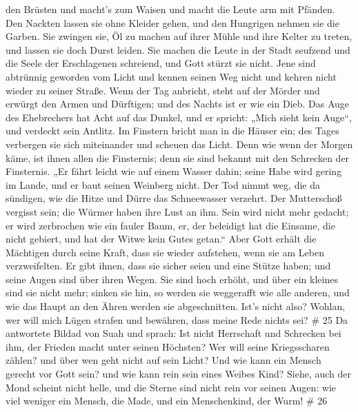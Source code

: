 den Brüsten und macht's zum Waisen und macht die Leute arm mit Pfänden.
 Den Nackten lassen sie ohne Kleider gehen, und den
Hungrigen nehmen sie die Garben.  Sie zwingen sie, Öl zu
machen auf ihrer Mühle und ihre Kelter zu treten, und lassen sie doch
Durst leiden.  Sie machen die Leute in der Stadt seufzend
und die Seele der Erschlagenen schreiend, und Gott stürzt sie nicht.
 Jene sind abtrünnig geworden vom Licht und kennen seinen
Weg nicht und kehren nicht wieder zu seiner Straße.  Wenn
der Tag anbricht, steht auf der Mörder und erwürgt den Armen und
Dürftigen; und des Nachts ist er wie ein Dieb.  Das Auge
des Ehebrechers hat Acht auf das Dunkel, und er spricht: „Mich sieht
kein Auge``, und verdeckt sein Antlitz.  Im Finstern bricht
man in die Häuser ein; des Tages verbergen sie sich miteinander und
scheuen das Licht.  Denn wie wenn der Morgen käme, ist
ihnen allen die Finsternis; denn sie sind bekannt mit den Schrecken der
Finsternis.  „Er fährt leicht wie auf einem Wasser dahin;
seine Habe wird gering im Lande, und er baut seinen Weinberg nicht.
 Der Tod nimmt weg, die da sündigen, wie die Hitze und
Dürre das Schneewasser verzehrt.  Der Mutterschoß vergisst
sein; die Würmer haben ihre Lust an ihm. Sein wird nicht mehr gedacht;
er wird zerbrochen wie ein fauler Baum,  er, der beleidigt
hat die Einsame, die nicht gebiert, und hat der Witwe kein Gutes
getan.``  Aber Gott erhält die Mächtigen durch seine Kraft,
dass sie wieder aufstehen, wenn sie am Leben verzweifelten.
 Er gibt ihnen, dass sie sicher seien und eine Stütze
haben; und seine Augen sind über ihren Wegen.  Sie sind
hoch erhöht, und über ein kleines sind sie nicht mehr; sinken sie hin,
so werden sie weggerafft wie alle anderen, und wie das Haupt an den
Ähren werden sie abgeschnitten.  Ist's nicht also? Wohlan,
wer will mich Lügen strafen und bewähren, dass meine Rede nichts sei? \#
25  Da antwortete Bildad von Suah und sprach: 
Ist nicht Herrschaft und Schrecken bei ihm, der Frieden macht unter
seinen Höchsten?  Wer will seine Kriegsscharen zählen? und
über wen geht nicht auf sein Licht?  Und wie kann ein Mensch
gerecht vor Gott sein? und wie kann rein sein eines Weibes Kind?
 Siehe, auch der Mond scheint nicht helle, und die Sterne
sind nicht rein vor seinen Augen:  wie viel weniger ein
Mensch, die Made, und ein Menschenkind, der Wurm! \# 26 
